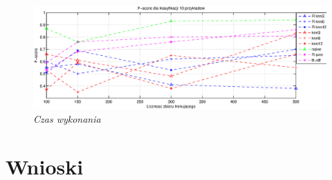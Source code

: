 \documentclass[a4paper, 10pt]{article}
\begin{document}
\begin{figure}[ht!]
\centering
\includegraphics[width=165mm]{wykresy/score500.eps}
\caption{\it{Czas wykonania }}
\label{overflow}
\end{figure}

\FloatBarrier

\section{Wnioski}







\nocite{*}

\end{document}
